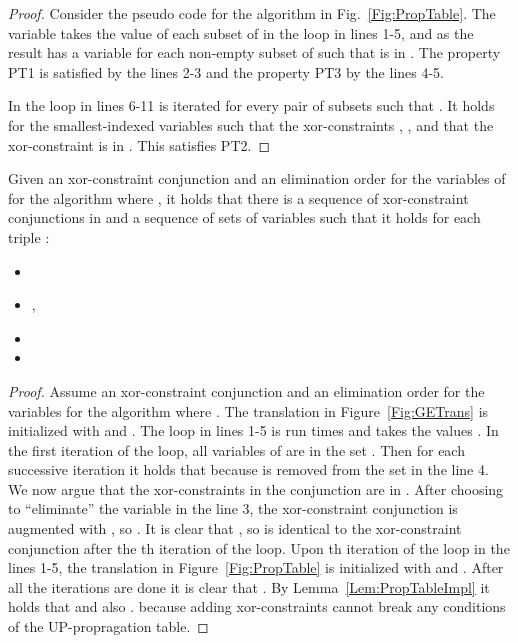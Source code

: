 \begin{proof}
Consider the pseudo code for the algorithm  in Fig.~\ref{Fig:PropTable}.
The variable  takes the value of each subset of  in the loop in 
lines 1-5, and as the result  has a variable  for each non-empty
subset  of  such that  is in . The property PT1 is satisfied by the lines 2-3 and the property PT3 by the lines 4-5.

In the loop in lines 6-11 is iterated for every pair of subsets  such that . It holds for the smallest-indexed
variables  such that 
 the xor-constraints ,
, and  that the xor-constraint 
is in . This satisfies PT2.
\end{proof}

\begin{lemma}
\label{Lem:GEConjunctions}
Given an xor-constraint conjunction  
and an elimination order
 for the variables of  for the algorithm
 where , it holds that there is a sequence of xor-constraint conjunctions  in  and a sequence of sets of variables
 such that
it holds for each triple :
\begin{itemize}
\item 
\item ,
\item 
\item 
\end{itemize}
\end{lemma}
\begin{proof}
Assume an xor-constraint conjunction  and an elimination
order  for the variables 
for the algorithm  where .
The translation  in Figure~\ref{Fig:GETrans} is initialized with  and . The loop in lines 1-5 is run  times and 
takes the values . In the first iteration of the loop, all
variables of  are in the set . Then for each successive
iteration  it holds that  because
 is removed from the set  in the line 4. 
We now argue that the xor-constraints in the conjunction   are in . 
After choosing to ``eliminate'' the variable  in the line 3, the
xor-constraint conjunction  is augmented with ,
    so .
It is clear that , so  is identical to
the xor-constraint conjunction  after the th iteration of the
loop.
Upon th iteration of the loop in the lines 1-5,       
the translation  in Figure~\ref{Fig:PropTable} is initialized
with  and . 
After all the  iterations are done it is clear that .
By Lemma~\ref{Lem:PropTableImpl} 
it holds that 
and also .
because adding xor-constraints cannot break any conditions
of the UP-propragation table.
\end{proof}

